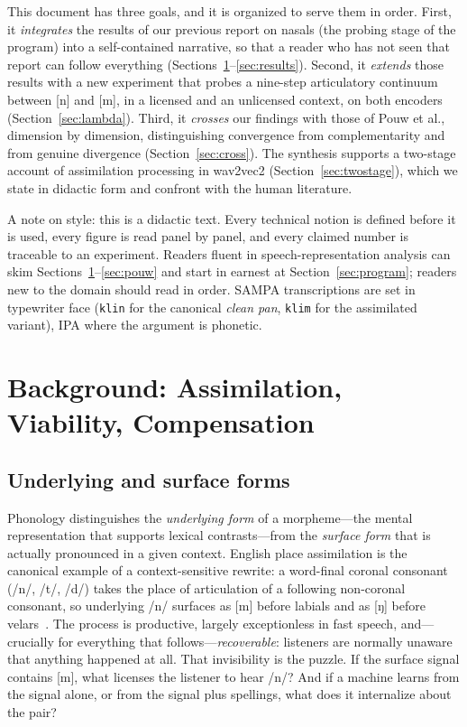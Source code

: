 \documentclass[11pt,a4paper]{article}
\newcommand{\sampa}[1]{\texttt{#1}}
\begin{document}
This document has three goals, and it is organized to serve them in
order. First, it \emph{integrates} the results of our previous report
on nasals (the probing stage of the program) into a self-contained
narrative, so that a reader who has not seen that report can follow
everything (Sections~\ref{sec:background}--\ref{sec:results}). Second,
it \emph{extends} those results with a new experiment that probes a
nine-step articulatory continuum between [n] and [m], in a licensed and
an unlicensed context, on both encoders (Section~\ref{sec:lambda}).
Third, it \emph{crosses} our findings with those of Pouw et al.,
dimension by dimension, distinguishing convergence from complementarity
and from genuine divergence (Section~\ref{sec:cross}). The synthesis
supports a two-stage account of assimilation processing in
wav2vec2 (Section~\ref{sec:twostage}), which we state in didactic form
and confront with the human literature.

A note on style: this is a didactic text. Every technical notion is
defined before it is used, every figure is read panel by panel, and
every claimed number is traceable to an experiment. Readers fluent in
speech-representation analysis can skim
Sections~\ref{sec:background}--\ref{sec:pouw} and start in earnest at
Section~\ref{sec:program}; readers new to the domain should read in
order. SAMPA transcriptions are set in typewriter face (\sampa{klin}
for the canonical \emph{clean pan}, \sampa{klim} for the assimilated
variant), IPA where the argument is phonetic.

\needspace{0.22\textheight}
\section{Background: Assimilation, Viability, Compensation}\label{sec:background}

\subsection{Underlying and surface forms}

Phonology distinguishes the \emph{underlying form} of a morpheme---the
mental representation that supports lexical contrasts---from the
\emph{surface form} that is actually pronounced in a given context.
English place assimilation is the canonical example of a
context-sensitive rewrite: a word-final coronal consonant (/n/, /t/,
/d/) takes the place of articulation of a following non-coronal
consonant, so underlying /n/ surfaces as [m] before labials and as
[ŋ] before velars~\citep{hura1992}. The process is
productive, largely exceptionless in fast speech, and---crucially for
everything that follows---\emph{recoverable}: listeners are normally
unaware that anything happened at all. That invisibility is the puzzle.
If the surface signal contains [m], what licenses the listener to hear
/n/? And if a machine learns from the signal alone, or from the signal
plus spellings, what does it internalize about the pair?
\end{document}
